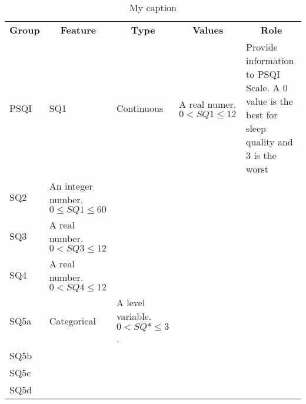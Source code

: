 \documentclass[10pt,letterpaper,oneside]{article}
\begin{document}
	\begin{table}[]
		\centering
		\caption{My caption}
		\label{my-label}
		\begin{tabular}{lllll}
			\multicolumn{1}{c}{\textbf{Group}} & \multicolumn{1}{c}{\textbf{Feature}}      & \multicolumn{1}{c}{\textbf{Type}}      & \multicolumn{1}{c}{\textbf{Values}}  & \multicolumn{1}{c}{\textbf{Role}}                                                             \\
			PSQI                               & SQ1                                       & Continuous                             & A real numer.   $ 0 <  SQ1 \leq 12 $ & Provide information to PSQI Scale. A 0 value is the best for sleep quality and 3 is the worst \\
			SQ2                                & An integer number. $ 0 \leq SQ1 \leq 60 $ &                                        &                                      &                                                                                               \\
			SQ3                                & A real number. $ 0 < SQ3 \leq 12 $        &                                        &                                      &                                                                                               \\
			SQ4                                & A real number. $ 0 < SQ4 \leq 12 $        &                                        &                                      &                                                                                               \\
			SQ5a                               & Categorical                               & A level variable. $ 0 < SQ*  \leq 3 $. &                                      &                                                                                               \\
			SQ5b                               &                                           &                                        &                                      &                                                                                               \\
			SQ5c                               &                                           &                                        &                                      &                                                                                               \\
			SQ5d                               &                                           &                                        &                                      &                                                                                               \\

\end{tabular}
\end{table}
\end{document}
